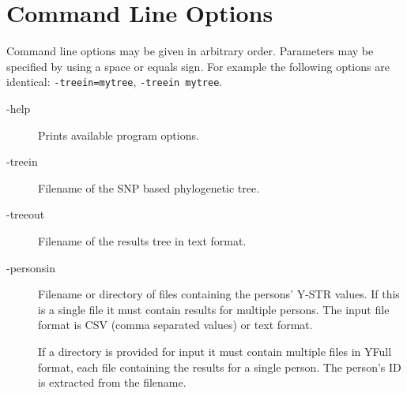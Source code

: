 \section{Command Line Options}

Command line options may be given in arbitrary order.
Parameters may be specified by using a space or equals sign.
For example the following options are identical:
\texttt{-treein=mytree}, \texttt{-treein mytree}.

\begin{description}
\item[-help] Prints available program options.

\item[-treein] Filename of the SNP based phylogenetic tree.
\item[-treeout] Filename of the results tree in text format.
\item[-personsin] Filename or directory of files containing the
	persons' Y-STR values. If this is a single file it must contain
	results for multiple persons. The input file format is CSV
    (comma separated values) or text format.

	If a directory is provided for input it must contain multiple
	files in YFull format, each file containing the results for
	a single person. The person's ID is extracted from the filename.


\end{description}
